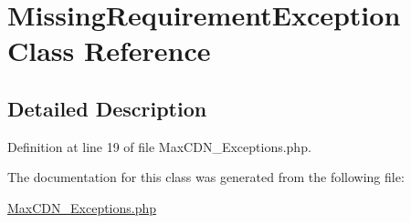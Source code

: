 \hypertarget{class_missing_requirement_exception}{
\section{MissingRequirementException Class Reference}
\label{class_missing_requirement_exception}
}


\subsection{Detailed Description}


Definition at line 19 of file MaxCDN\_\-Exceptions.php.



The documentation for this class was generated from the following file:\begin{DoxyCompactItemize}
\item 
\hyperlink{_max_c_d_n___exceptions_8php}{MaxCDN\_\-Exceptions.php}\end{DoxyCompactItemize}
